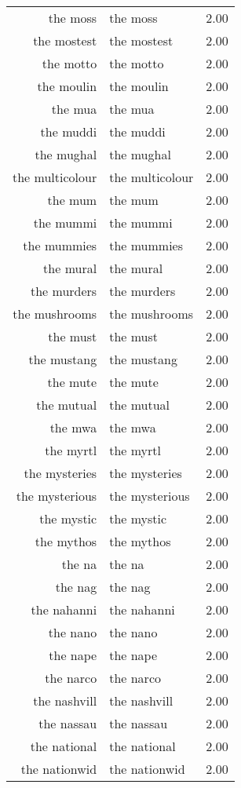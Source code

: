 \begin{table}[ht]
\begin{tabular}{rlr}
  the moss & the moss & 2.00 \\ 
  the mostest & the mostest & 2.00 \\ 
  the motto & the motto & 2.00 \\ 
  the moulin & the moulin & 2.00 \\ 
  the mua & the mua & 2.00 \\ 
  the muddi & the muddi & 2.00 \\ 
  the mughal & the mughal & 2.00 \\ 
  the multicolour & the multicolour & 2.00 \\ 
  the mum & the mum & 2.00 \\ 
  the mummi & the mummi & 2.00 \\ 
  the mummies & the mummies & 2.00 \\ 
  the mural & the mural & 2.00 \\ 
  the murders & the murders & 2.00 \\ 
  the mushrooms & the mushrooms & 2.00 \\ 
  the must & the must & 2.00 \\ 
  the mustang & the mustang & 2.00 \\ 
  the mute & the mute & 2.00 \\ 
  the mutual & the mutual & 2.00 \\ 
  the mwa & the mwa & 2.00 \\ 
  the myrtl & the myrtl & 2.00 \\ 
  the mysteries & the mysteries & 2.00 \\ 
  the mysterious & the mysterious & 2.00 \\ 
  the mystic & the mystic & 2.00 \\ 
  the mythos & the mythos & 2.00 \\ 
  the na & the na & 2.00 \\ 
  the nag & the nag & 2.00 \\ 
  the nahanni & the nahanni & 2.00 \\ 
  the nano & the nano & 2.00 \\ 
  the nape & the nape & 2.00 \\ 
  the narco & the narco & 2.00 \\ 
  the nashvill & the nashvill & 2.00 \\ 
  the nassau & the nassau & 2.00 \\ 
  the national & the national & 2.00 \\ 
  the nationwid & the nationwid & 2.00 \\ 

\end{tabular}
\end{table}
